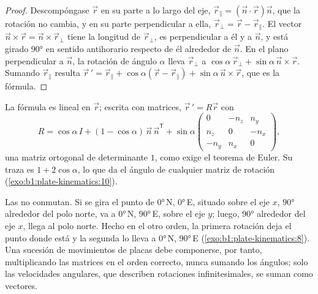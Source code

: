 \begin{proof}
Descompóngase $\vec r$ en su parte a lo largo del eje, $\vec r_\parallel =
(\vec n\cdot\vec r)\vec n$, que la rotación no cambia, y en su parte perpendicular a ella, $\vec r_\perp = \vec r - \vec r_\parallel$. El vector
$\vec n\times\vec r = \vec n\times\vec r_\perp$ tiene la longitud de $\vec r_\perp$, es perpendicular a él y a $\vec n$, y está girado
\ang{90} en sentido antihorario respecto de él alrededor de $\vec n$. En el plano perpendicular a $\vec n$, la rotación de
ángulo $\alpha$ lleva $\vec r_\perp$ a $\cos\alpha\,\vec r_\perp +
\sin\alpha\,\vec n\times\vec r$. Sumando $\vec r_\parallel$ resulta $\vec r\,' =
\vec r_\parallel + \cos\alpha(\vec r - \vec r_\parallel) + \sin\alpha\,
\vec n\times\vec r$, que es la fórmula.
\end{proof}

La fórmula es lineal en $\vec r$; escrita con matrices, $\vec r\,' = R\vec r$
con
\[
  R = \cos\alpha\,I + (1 - \cos\alpha)\,\vec n\,\vec n^{\mathsf T}
  + \sin\alpha
  \begin{pmatrix} 0 & -n_z & n_y\\ n_z & 0 & -n_x\\ -n_y & n_x & 0\end{pmatrix},
\]
una matriz ortogonal de determinante $1$, como exige el teorema de Euler. Su traza
es $1 + 2\cos\alpha$, lo que da el ángulo de cualquier matriz de rotación
(\cref{exo:b1:plate-kinematics:10}).

Las  no conmutan. Si se gira el punto de \ang{0}\,N, \ang{0}\,E, situado sobre el eje $x$, \ang{90} alrededor del polo
norte, va a \ang{0}\,N, \ang{90}\,E, sobre el eje $y$; luego, \ang{90} alrededor del eje $x$, llega al polo norte. Hecho en el otro
orden, la primera rotación deja el punto donde está y la segunda lo lleva a \ang{0}\,N, \ang{90}\,E
(\cref{exo:b1:plate-kinematics:8}). Una sucesión de movimientos de placas debe componerse, por tanto, multiplicando las matrices en el
orden correcto, nunca sumando los ángulos; solo las velocidades angulares, que describen rotaciones infinitesimales, se suman como vectores.

